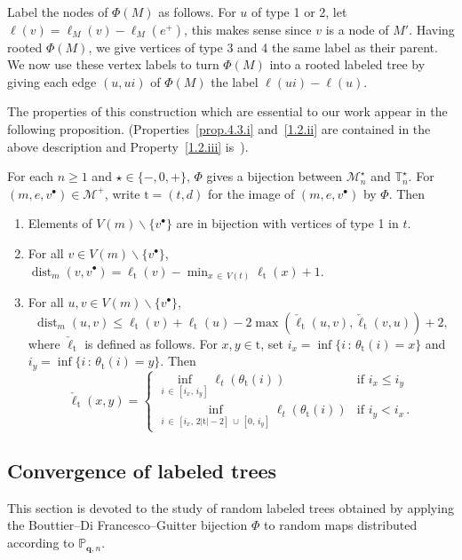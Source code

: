 \documentclass[10pt]{amsart}
\theoremstyle{definition}\newtheorem{defi}[theo]{Definition}\newtheorem{rema}[theo]{Remark}\newtheorem{exam}[theo]{Example}\newtheorem{exem}[theo]{Example}\newtheorem{nota}[theo]{Notation}
\newcommand{\bbP}{\mathbb{P}}
\newcommand{\bbT}{\mathbb{T}}
\newcommand{\bfq}{\mathbf{q}}
\newcommand{\cM}{\mathcal{M}}
\newcommand{\rt}{\mathrm{t}}
\DeclareMathOperator{\dist}{dist}
\newcommand{\sbt}{{\ensuremath{\scriptscriptstyle\bullet}}}
\newcommand*{\romanenumi}{\renewcommand*{\theenumi}{\roman{enumi}}}
\begin{document}
Label the nodes of $\Phi(M)$ as follows. For $u$ of type 1 or 2, let $\ell(v)=\ell_M(v)-\ell_M(e^+)$, this makes sense since $v$ is a node of $M'$. Having rooted $\Phi(M)$, we give vertices of type 3 and 4 the same label as their parent. We now use these vertex labels to turn $\Phi(M)$ into a rooted labeled tree by giving each edge $(u,ui)$ of $\Phi(M)$ the label $\ell(ui)-\ell(u)$.

The properties of this construction which are essential to our work appear in the following proposition. (Properties~\eqref{prop.4.3.i} and~\eqref{1.2.ii} are contained in the above description and Property~\eqref{1.2.iii} is~\cite[Lemma~3.1]{LeGallInventiones}).

\begin{prop}\label{prop:BDG}
For each $n\geq 1$ and $\star\in\{-,0,+\}$, $\Phi$ gives a bijection between $\cM_n^\star$ and $\bbT_{n}^\star$. For $(m,e,v^\sbt) \in \cM^+$, write $\rt=(t,d)$ for the image of $(m,e,v^\sbt)$ by $\Phi$. Then
\begin{enumerate}\romanenumi
\item \label{prop.4.3.i} Elements of $V(m)\backslash \{v^\sbt\}$ are in bijection with vertices of type 1 in $t$.
\item \label{prop.4.3.ii}For all $v\in V(m)\backslash \{v^\sbt\}$, $\dist_m(v,v^\sbt) = \ell_\rt(v)-\min_{x\,\in\,V(t)}\ell_\rt(x)+1$.
\item \label{prop.4.3.iii} For all $u,v \in V(m)\backslash \{v^\sbt\}$,
\[
\dist_m(u,v) \leq \ell_\rt(v) + \ell_\rt(u) - 2 \max\left(
\check \ell_\rt\left(u,v\right),\check \ell_\rt\left(v,u\right)\right)+2,
\]
where $\check \ell_\rt$ is defined as follows. For $x,y \in \rt$, set $i_x=\inf\{i\,:\,\theta_\rt(i)=x\}$ and $i_y=\inf\{i\,:\,\theta_\rt(i)=y\}$. Then
\[
\check\ell_\rt\left(x,y\right)=
\begin{cases}
\inf_{i\,\in\,[i_x,\,i_y]}\ell_t(\theta_\rt(i))&\text{if }i_x\leq i_{y}\\
\inf_{i\,\in\,\left[i_x,\,2|\rt|-2\right]\,\cup\,[0,\,i_y]}\ell_t(\theta_\rt(i))&\text{if }i_y< i_{x}\,.
\end{cases}
\]
\end{enumerate}
\end{prop}

\subsection{Convergence of labeled trees}\label{sub:invariance}
This section is devoted to the study of random labeled trees obtained by applying the Bouttier--Di Francesco--Guitter bijection $\Phi$ to random maps distributed according to $\bbP_{\bfq,n}$.
\end{document}
